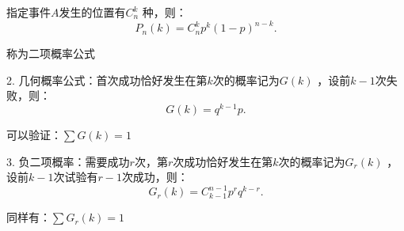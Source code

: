     指定事件$A$发生的位置有$C_{n}^{k}$ 种，则：\[
        P_n\left( k \right) =C_{n}^{k}p^{k}\left( 1-p \right) ^{n-k}
    .\] 

    称为二项概率公式

    2. 几何概率公式：首次成功恰好发生在第$k$次的概率记为$G\left( k \right) $ ，设前$k-1$次失败，则：\[
        G\left( k \right)= q^{k-1}p
    .\] 

    可以验证：$\sum G\left( k \right) =1$ 

    3. 负二项概率：需要成功$r$次，第$r$次成功恰好发生在第$k$次的概率记为$G_r\left( k \right) $ ，设前$k-1$次试验有$r-1$次成功，则：\[
        G_r\left( k \right) =C_{k-1}^{n-1}p^rq^{k-r}
    .\] 

    同样有：$\sum G_r\left( k \right) =1$






























